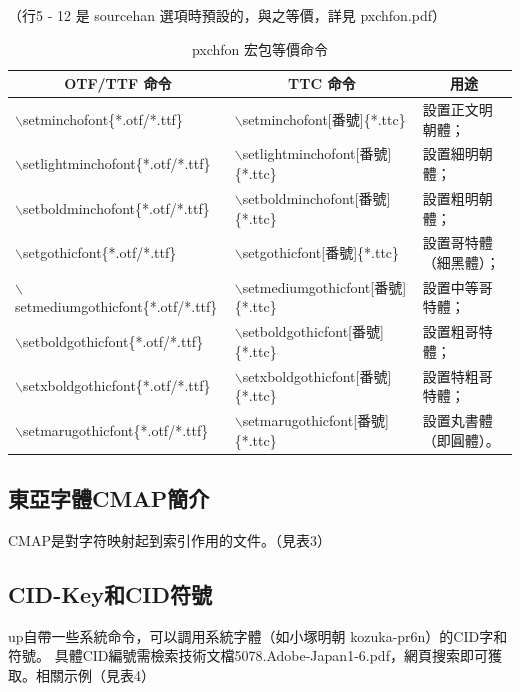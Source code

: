 （行5 - 12 是 sourcehan 選項時預設的，與之等價，詳見 pxchfon.pdf）

\begin{table}[H]
\begin{center}
\caption{pxchfon 宏包等價命令}
{\fontsize{8pt}{12}\selectfont\ttfamily
\begin{tabular}{|l|l|l|}
 \hline
 \multicolumn{1}{|c|}{OTF/TTF 命令} & \multicolumn{1}{|c|}{TTC 命令} & \multicolumn{1}{|c|}{用途} \\ \hline
$\backslash$setminchofont\{*.otf/*.ttf\} & $\backslash$setminchofont[番號]\{*.ttc\} & 設置正文明朝體；\\
$\backslash$setlightminchofont\{*.otf/*.ttf\} & $\backslash$setlightminchofont[番號]\{*.ttc\} & 設置細明朝體；\\
$\backslash$setboldminchofont\{*.otf/*.ttf\} & $\backslash$setboldminchofont[番號]\{*.ttc\} & 設置粗明朝體；\\
$\backslash$setgothicfont\{*.otf/*.ttf\} & $\backslash$setgothicfont[番號]\{*.ttc\} & 設置哥特體（細黑體）；\\
$\backslash$setmediumgothicfont\{*.otf/*.ttf\} & $\backslash$setmediumgothicfont[番號]\{*.ttc\} & 設置中等哥特體；\\
$\backslash$setboldgothicfont\{*.otf/*.ttf\} & $\backslash$setboldgothicfont[番號]\{*.ttc\} & 設置粗哥特體；\\
$\backslash$setxboldgothicfont\{*.otf/*.ttf\} & $\backslash$setxboldgothicfont[番號]\{*.ttc\} & 設置特粗哥特體；\\
$\backslash$setmarugothicfont\{*.otf/*.ttf\} & $\backslash$setmarugothicfont[番號]\{*.ttc\} & 設置丸書體（即圓體）。\\ \hline
\end{tabular} }
\end{center}
\end{table}

\subsection{東亞字體CMAP簡介}
\par{}CMAP是對字符映射起到索引作用的文件。（見表3）

\subsection{CID-Key和CID符號}

\par{}{up\LaTeXe}自帶一些系統命令，可以調用系統字體（如小塚明朝 kozuka-pr6n）的CID字和符號。
具體CID編號需檢索技術文檔{5078.Adobe-Japan1-6.pdf}，網頁搜索即可獲取。相關示例（見表4）

